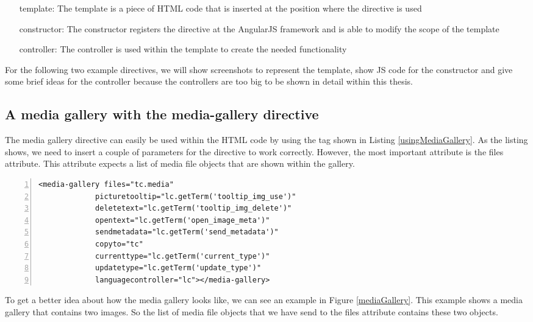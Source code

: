 \begin{itemize}
	\item[template:] The template is a piece of \ac{HTML} code that is inserted at the position where the directive is used 
	\item[constructor:] The constructor registers the directive at the AngularJS framework and is able to modify the scope of the template
	\item[controller:] The controller is used within the template to create the needed functionality
\end{itemize}

For the following two example directives, we will show screenshots to represent the template, show \ac{JS} code for the constructor and give some brief ideas for the controller because the controllers are too big to be shown in detail within this thesis.
\subsection{A media gallery with the media-gallery directive}
The media gallery directive can easily be used within the \ac{HTML} code by using the tag shown in Listing \ref{usingMediaGallery}. As the listing shows, we need to insert a couple of parameters for the directive to work correctly. However, the most important attribute is the files attribute. This attribute expects a list of media file objects that are shown within the gallery.

\begin{lstlisting}[numbers=left,caption={The listing shows the usage of the media gallery directive},label=usingMediaGallery,frame=tlbr,breaklines]
<media-gallery files="tc.media"
             picturetooltip="lc.getTerm('tooltip_img_use')"
             deletetext="lc.getTerm('tooltip_img_delete')"
             opentext="lc.getTerm('open_image_meta')"
             sendmetadata="lc.getTerm('send_metadata')"
             copyto="tc"
             currenttype="lc.getTerm('current_type')"
             updatetype="lc.getTerm('update_type')"
             languagecontroller="lc"></media-gallery>
\end{lstlisting}

To get a better idea about how the media gallery looks like, we can see an example in Figure \ref{mediaGallery}. This example shows a media gallery that contains two images. So the list of media file objects that we have send to the files attribute contains these two objects. 

